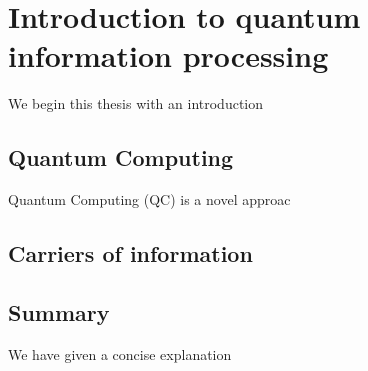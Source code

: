 \chapter{Introduction to quantum information processing} 
\label{ch:Introduction}

We begin this thesis with an introduction 

\section{Quantum Computing}

Quantum Computing (QC) is a novel approac




\section{Carriers of information}

\section{Summary}

We have given a concise explanation 

